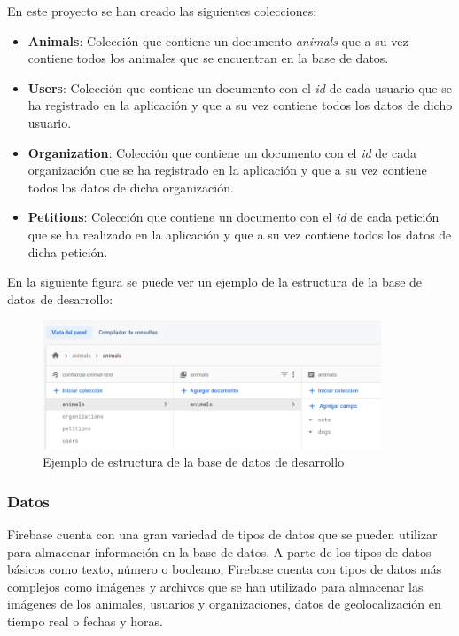 En este proyecto se han creado las siguientes colecciones:

\begin{itemize}
    \item \textbf{Animals}: Colección que contiene un documento \textit{animals} que a su vez contiene todos los animales que se encuentran en la base de datos.
    \item \textbf{Users}: Colección que contiene un documento con el \textit{id} de cada usuario que se ha registrado en la aplicación y que a su vez contiene
    todos los datos de dicho usuario.
    \item \textbf{Organization}: Colección que contiene un documento con el \textit{id} de cada organización que se ha registrado en la aplicación y que a su vez contiene
    todos los datos de dicha organización.
    \item \textbf{Petitions}: Colección que contiene un documento con el \textit{id} de cada petición que se ha realizado en la aplicación y que a su vez contiene
    todos los datos de dicha petición.
\end{itemize}

En la siguiente figura se puede ver un ejemplo de la estructura de la base de datos de desarrollo: \\

\begin{figure}[H]
    \centering
    \includegraphics[width=0.9\textwidth]{imgs/database-test.png}
    \caption{Ejemplo de estructura de la base de datos de desarrollo}
    \label{fig:database}
\end{figure}

\newpage

\subsubsection{Datos}\label{subsubsec:datos}

Firebase cuenta con una gran variedad de tipos de datos que se pueden utilizar para almacenar información en la base de datos.
A parte de los tipos de datos básicos como texto, número o booleano, Firebase cuenta con tipos de datos más complejos como
imágenes y archivos que se han utilizado para almacenar las imágenes de los animales, usuarios y organizaciones,
datos de geolocalización en tiempo real o fechas y horas. \\

